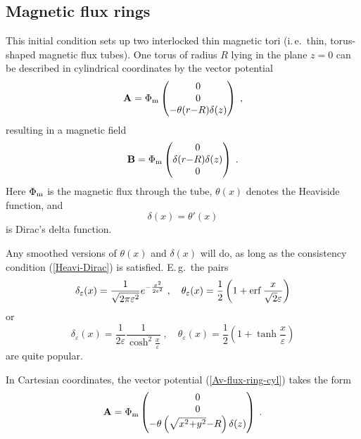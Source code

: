 \documentclass[12pt,twoside,notitlepage,a4paper]{article}
\newcommand{\erf}     {\mathop{\rm erf}\nolimits}
\newcommand{\vekt}[1] {\mathbf{#1}}
\newcommand{\Av}            {\vekt{A}}
\newcommand{\Bv}            {\vekt{B}}
\newcommand{\Heavi}         {\theta}
\begin{document}

\subsection{Magnetic flux rings}

This initial condition sets up two interlocked thin magnetic tori
(i.\,e.~thin, torus-shaped magnetic flux tubes).
One torus of radius $R$ lying in the plane $z=0$ can be described in
cylindrical coordinates by the
vector potential
\begin{equation} \label{Av-flux-ring-cyl}
  \Av = 
  \Phi_{\rm m}
  \begin{pmatrix}
    0\\ 0\\ -\Heavi(r{-}R) \delta(z)
  \end{pmatrix} \; ,
\end{equation}
resulting in a magnetic field
\begin{equation}
  \Bv = 
  \Phi_{\rm m}
  \begin{pmatrix}
    0\\ \delta(r{-}R) \delta(z)\\ 0
  \end{pmatrix} \; .
\end{equation}
Here $\Phi_{\rm m}$ is the magnetic flux through the tube,
$\Heavi(x)$ denotes the Heaviside function, and
\begin{equation} \label{Heavi-Dirac}
 \delta(x) = \Heavi'(x)
\end{equation}
is Dirac's delta function.

Any smoothed versions of $\Heavi(x)$ and $\delta(x)$ will do, as long as
the consistency condition (\ref{Heavi-Dirac}) is satisfied.
E.\,g.~the pairs
\begin{equation}
  \delta_\varepsilon(x)
  = \frac{1}{\sqrt{2\pi\varepsilon^2}} e^{-\frac{x^2}{2\varepsilon^2}} \; ,
  \quad
  \Heavi_\varepsilon(x)
  = \frac{1}{2} \left( 1 + \erf\frac{x}{\sqrt{2}\varepsilon} \right)
\end{equation}
or
\begin{equation}
  \delta_\varepsilon(x)
  = \frac{1}{2\varepsilon}\frac{1}{\cosh^2\frac{x}{\varepsilon}} \; ,
  \quad
  \Heavi_\varepsilon(x)
  = \frac{1}{2} \left( 1 + \tanh\frac{x}{\varepsilon} \right)
\end{equation}
are quite popular.

In Cartesian coordinates, the vector potential (\ref{Av-flux-ring-cyl})
takes the form
\begin{equation} \label{Av-flux-ring-cart}
  \Av =
  \Phi_{\rm m}
  \begin{pmatrix}
    0\\ 0\\ -\Heavi \left( \sqrt{x^2{+}y^2}{-}R \right) \delta(z)
  \end{pmatrix} \; .
\end{equation}
\end{document}

